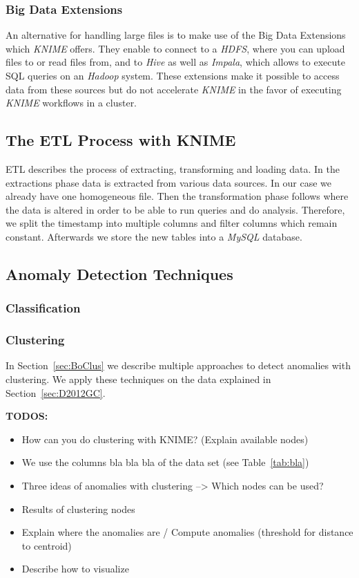 \documentclass{dima}
\begin{document}

\subsubsection{Big Data Extensions}
An alternative for handling large files is to make use of the Big Data Extensions which \textit{KNIME} offers. They enable to connect to a \textit{HDFS}, where you can upload files to or read files from, and to \textit{Hive} as well as \textit{Impala}, which allows to execute SQL queries on an \textit{Hadoop} system. These extensions make it possible to access data from these sources but do not accelerate \textit{KNIME} in the favor of executing \textit{KNIME} workflows in a cluster.

\subsection{The ETL Process with KNIME}
ETL describes the process of extracting, transforming and loading data. In the extractions phase data is extracted from various data sources. In our case we already have one homogeneous file. Then the transformation phase follows where the data is altered in order to be able to run queries and do analysis. Therefore, we split the timestamp into multiple columns and filter columns which remain constant. Afterwards we store the new tables into a \textit{MySQL} database.


\subsection{Anomaly Detection Techniques}
\subsubsection{Classification}

\subsubsection{Clustering}
In Section~\ref{sec:BoClus} we describe multiple approaches to detect anomalies with clustering. We apply these techniques on the data explained in Section~\ref{sec:D2012GC}.

\textbf{TODOS:}
\begin{itemize}
\item How can you do clustering with KNIME? (Explain available nodes)
\item We use the columns bla bla bla of the data set (see Table~\ref{tab:bla})
\item Three ideas of anomalies with clustering --> Which nodes can be used?
\item Results of clustering nodes
\item Explain where the anomalies are / Compute anomalies (threshold for distance to centroid)
\item Describe how to visualize 
\end{itemize}
\end{document}
